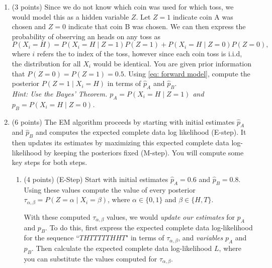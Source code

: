 \documentclass[11pt]{article}
\begin{document}
\begin{enumerate}[(1)]
\item (3 points) Since we do not know which coin was used for which toss, we would model this as a hidden variable $Z$. Let $Z = 1$ indicate coin A was chosen and $Z = 0$ indicate that coin B was chosen. We can then express the probability of observing an heads on any toss as 
\begin{equation}
    P(X_i = H) = P(X_i = H \mid Z = 1)P(Z = 1) + P(X_i = H \mid Z = 0)P(Z = 0),
    \label{eq: forward model}
\end{equation}
where $i$ refers the to index of the toss, however since each coin toss is i.i.d, the distribution for all $X_i$ would be identical. You are given prior information that $P(Z = 0) = P(Z = 1) = 0.5$. Using \eqref{eq: forward model}, compute the posterior $P(Z = 1 \mid X_i = H)$ in terms of $\hat{p}_A$ and $\hat{p}_B$.\\
\textit{Hint: Use the Bayes' Theorem. $p_A = P(X_i = H \mid Z = 1)$ and $p_B = P(X_i = H \mid Z = 0)$. }

\begin{answertext}{10cm}{}
\end{answertext}

\item (6 points) The EM algorithm proceeds by starting with initial estimates $\hat{p}_A$ and $\hat{p}_B$ and computes the expected complete data log likelihood (E-step). It then updates its estimates by maximizing this expected complete data log-likelihood by keeping the posteriors fixed (M-step). You will compute some key steps for both steps.

\begin{enumerate}[(2.1)]
\item (4 points) (E-Step) Start with initial estimates $\hat{p}_A = 0.6$ and $\hat{p}_B = 0.8$. Using these values compute the value of every posterior $\tau_{\alpha, \beta} = P(Z = \alpha \mid X_i = \beta)$, where $\alpha \in \{0, 1\}$ and $\beta \in \{H, T\}$. 

With these computed $\tau_{\alpha, \beta}$ values, we would \textit{update our estimates} for $p_A$ and $p_B$. To do this, first express the expected complete data log-likelihood for the sequence ``$THTTTTTHHT$" in terms of $\tau_{\alpha, \beta}$, and \textit{variables} $p_A$ and $p_B$.  Then calculate the expected complete data log-likelihood $L$, where you can substitute the values computed for $\tau_{\alpha, \beta}$.


\end{enumerate}
\end{enumerate}
\end{document}
